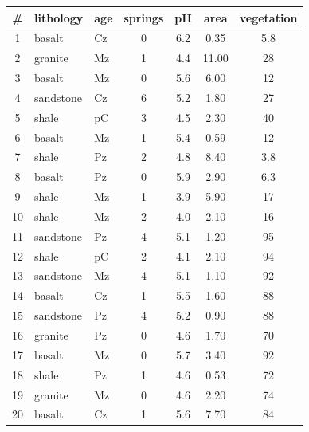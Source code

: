 \noindent\begin{minipage}[t][][b]{.55\linewidth}
\begin{tabular}{c|l@{\gap}l@{\gap}c@{\gap}c@{\gap}c@{\gap}c}
\# & lithology & age & springs & pH & area & vegetation \\ \hline
1 & basalt & Cz & 0 & 6.2 & 0.35 & 5.8 \\
2 & granite & Mz & 1 & 4.4 & 11.00 & 28 \\
3 & basalt & Mz & 0 & 5.6 & 6.00 & 12 \\
4 & sandstone & Cz & 6 & 5.2 & 1.80 & 27 \\
5 & shale & pC & 3 & 4.5 & 2.30 & 40 \\
6 & basalt & Mz & 1 & 5.4 & 0.59 & 12 \\
7 & shale & Pz & 2 & 4.8 & 8.40 & 3.8 \\
8 & basalt & Pz & 0 & 5.9 & 2.90 & 6.3 \\
9 & shale & Mz & 1 & 3.9 & 5.90 & 17 \\
10 & shale & Mz & 2 & 4.0 & 2.10 & 16 \\
11 & sandstone & Pz & 4 & 5.1 & 1.20 & 95 \\
12 & shale & pC & 2 & 4.1 & 2.10 & 94 \\
13 & sandstone & Mz & 4 & 5.1 & 1.10 & 92 \\
14 & basalt & Cz & 1 & 5.5 & 1.60 & 88 \\
15 & sandstone & Pz & 4 & 5.2 & 0.90 & 88 \\
16 & granite & Pz & 0 & 4.6 & 1.70 & 70 \\
17 & basalt & Mz & 0 & 5.7 & 3.40 & 92 \\
18 & shale & Pz & 1 & 4.6 & 0.53 & 72 \\
19 & granite & Mz & 0 & 4.6 & 2.20 & 74 \\
20 & basalt & Cz & 1 & 5.6 & 7.70 & 84 \\
\end{tabular}\medskip
\end{minipage}
\begin{minipage}[t][][t]{.45\linewidth}
\label{tab:catchments}
\end{minipage}\medskip

